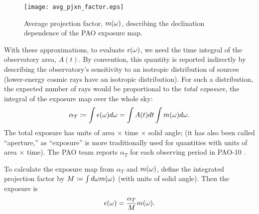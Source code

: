 \begin{figure}
\centerline{\texttt{[image: avg\_pjxn\_factor.eps]}}
\caption{Average projection factor, $m(\omega)$, describing the declination
dependence of the PAO exposure map.}
\label{fig:pjxn}
\end{figure}

With these approximations, to evaluate $\epsilon(\omega)$, we need the
time integral of the observatory area, $A(t)$.  By convention, this
quantity is reported indirectly by describing the observatory's
sensitivity to an isotropic distribution of sources (lower-energy cosmic
rays have an isotropic distribution).  For such a distribution, the expected
number of rays would be proportional to the {\em total exposure}, the
integral of the exposure map over the whole sky:
\begin{equation}
\alpha_T \coloneqq \int \expo(\tdrxn) d\tdrxn = \int A(t) dt \int m(\tdrxn) d\tdrxn.
\label{ET-def}
\end{equation}
The total exposure has units of area $\times$ time $\times$ solid angle;
(it has also been called ``aperture,'' as ``exposure'' is more traditionally
used for quantities with units of area $\times$ time).  The PAO team
reports $\alpha_T$ for each observing period in PAO-10 \cite{PAO10-AnisoUpdate}.

To calculate the exposure map from $\alpha_T$ and $m(\omega)$, define the
integrated projection factor by $M \coloneqq \int d\omega m(\omega)$ (with
units of solid angle).  Then the exposure is
\begin{equation}
\expo(\tdrxn) = \frac{\alpha_T}{M} m(\tdrxn).
\label{expo-mET}
\end{equation}
